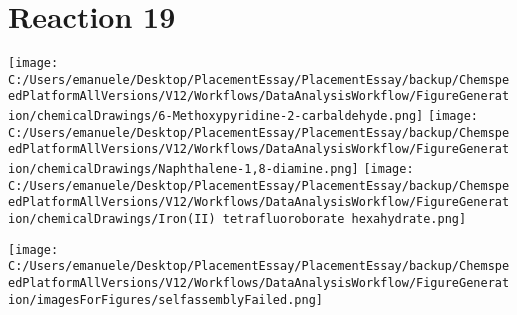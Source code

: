 \documentclass{article}%
\begin{document}
\section*{Reaction 19}%
%
\begin{scheme}[H]%
\begin{minipage}{0.5\textwidth}%
\texttt{[image: C:/Users/emanuele/Desktop/PlacementEssay/PlacementEssay/backup/ChemspeedPlatformAllVersions/V12/Workflows/DataAnalysisWorkflow/FigureGeneration/chemicalDrawings/6-Methoxypyridine-2-carbaldehyde.png]}%
\texttt{[image: C:/Users/emanuele/Desktop/PlacementEssay/PlacementEssay/backup/ChemspeedPlatformAllVersions/V12/Workflows/DataAnalysisWorkflow/FigureGeneration/chemicalDrawings/Naphthalene-1,8-diamine.png]}%
\texttt{[image: C:/Users/emanuele/Desktop/PlacementEssay/PlacementEssay/backup/ChemspeedPlatformAllVersions/V12/Workflows/DataAnalysisWorkflow/FigureGeneration/chemicalDrawings/Iron(II) tetrafluoroborate hexahydrate.png]}%
\end{minipage}%
\begin{minipage}{0.5\textwidth}%
\begin{center}%
\texttt{[image: C:/Users/emanuele/Desktop/PlacementEssay/PlacementEssay/backup/ChemspeedPlatformAllVersions/V12/Workflows/DataAnalysisWorkflow/FigureGeneration/imagesForFigures/selfassemblyFailed.png]}%
\end{center}%
\end{minipage}%
\caption{Self-assembly of components 6, 21, with Iron(II) in a 3.0:1.5:1.0 molar ratio in CH$_3$CN at 60\textdegree C for 40h. These are the reagents (starting materials) for reaction 19.}%
\end{scheme}%
\end{document}
